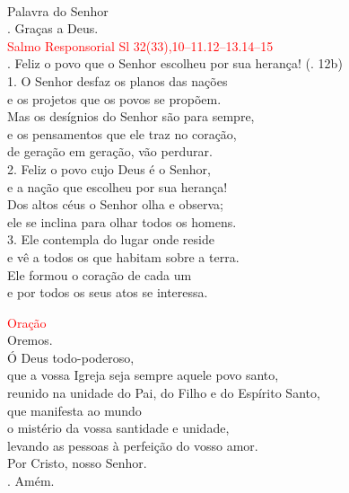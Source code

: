 \documentclass{book}
\begin{document}
\begin{flushleft}
    \vspace{.1cm} \\
    Palavra do Senhor \\
    {\color{red} \Rbar.} Graças a Deus.
    \vspace{.2cm} \\
    \textcolor{red}{Salmo Responsorial
        \hspace{\fill} Sl 32(33),10--11.12--13.14--15}
    \vspace{.1cm} \\
    {\color{red} \Rbar.} Feliz o povo que o Senhor escolheu por sua herança!
    \hspace{\fill}
    {\color{red} (\Rbar. 12b)}
    \vspace{.1cm} \\
    1. O Senhor desfaz os planos das nações \\
    e os projetos que os povos se propõem. \\
    Mas os desígnios do Senhor são para sempre, \\
    e os pensamentos que ele traz no coração, \\
    de geração em geração, vão perdurar.
    \vspace{.1cm} \\
    2. Feliz o povo cujo Deus é o Senhor, \\
    e a nação que escolheu por sua herança! \\
    Dos altos céus o Senhor olha e observa; \\
    ele se inclina para olhar todos os homens.
    \vspace{.1cm} \\
    3. Ele contempla do lugar onde reside \\
    e vê a todos os que habitam sobre a terra. \\
    Ele formou o coração de cada um \\
    e por todos os seus atos se interessa.

    \newpage

    \textcolor{red}{Oração}
    \vspace{.1cm} \\
    Oremos.
    \vspace{.1cm}\\
    Ó Deus todo-poderoso, \\
    que a vossa Igreja seja sempre aquele povo santo, \\
    reunido na unidade do Pai, do Filho e do Espírito Santo, \\
    que manifesta ao mundo \\
    o mistério da vossa santidade e unidade, \\
    levando as pessoas à perfeição do vosso amor. \\
    Por Cristo, nosso Senhor. \\
    {\color{red} \Rbar.} Amém.
    \vspace{.2cm} \\


\end{flushleft}
\end{document}
